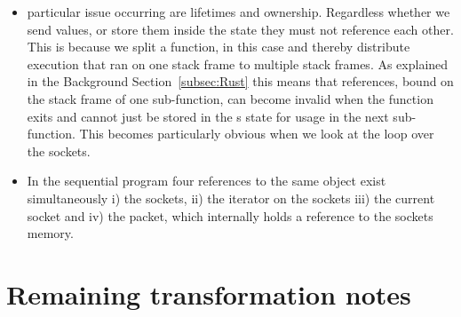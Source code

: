 \documentclass{scrartcl}
\begin{document}
\begin{itemize}
    \item particular issue occurring are lifetimes and ownership. Regardless whether we send values, or store them inside the state they must not reference each other. This is because we split a function, in this case  and thereby distribute execution that ran on one stack frame to multiple stack frames. As explained in the Background Section~\ref{subsec:Rust} this means that references, bound on the stack frame of one sub-function, can become invalid when the function exits and cannot just be stored in the \stack{}s state for usage in the next sub-function. This becomes particularly obvious when we look at the loop over the sockets. 
    \item In the sequential program four references to the same object exist simultaneously i) the sockets, ii) the iterator on the sockets iii) the current socket and iv) the packet, which internally holds a reference to the sockets memory. 
\end{itemize}

\section{Remaining transformation notes}
\end{document}
